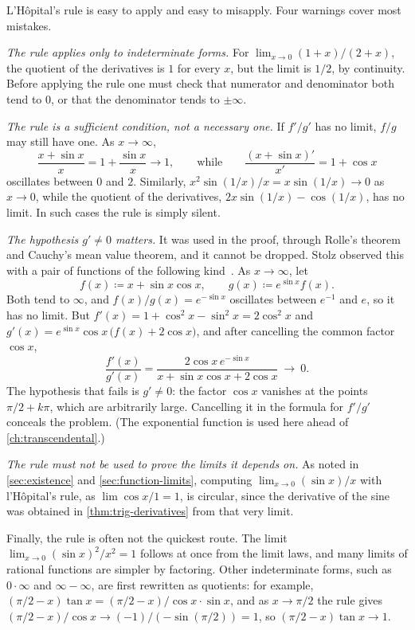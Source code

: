 L'H\^opital's rule is easy to apply and easy to misapply. Four warnings cover most mistakes.

\emph{The rule applies only to indeterminate forms.} For $\lim_{x\to0}(1+x)/(2+x)$, the quotient of the derivatives is $1$ for every $x$, but the limit is $1/2$, by continuity. Before applying the rule one must check that numerator and denominator both tend to $0$, or that the denominator tends to $\pm\infty$.

\emph{The rule is a sufficient condition, not a necessary one.} If $f'/g'$ has no limit, $f/g$ may still have one. As $x\to\infty$,
\[
\frac{x+\sin x}x=1+\frac{\sin x}x\to1,\qquad\text{while}\qquad\frac{(x+\sin x)'}{x'}=1+\cos x
\]
oscillates between $0$ and $2$. Similarly, $x^2\sin(1/x)/x=x\sin(1/x)\to0$ as $x\to0$, while the quotient of the derivatives, $2x\sin(1/x)-\cos(1/x)$, has no limit. In such cases the rule is simply silent.

\emph{The hypothesis $g'\ne0$ matters.} It was used in the proof, through Rolle's theorem and Cauchy's mean value theorem, and it cannot be dropped. Stolz observed this with a pair of functions of the following kind~\cite{boas1986}. As $x\to\infty$, let
\[
f(x)\coloneqq x+\sin x\cos x,\qquad g(x)\coloneqq e^{\sin x}f(x).
\]
Both tend to $\infty$, and $f(x)/g(x)=e^{-\sin x}$ oscillates between $e^{-1}$ and $e$, so it has no limit. But $f'(x)=1+\cos^2x-\sin^2x=2\cos^2x$ and $g'(x)=e^{\sin x}\cos x\,\bigl(f(x)+2\cos x\bigr)$, and after cancelling the common factor $\cos x$,
\[
\frac{f'(x)}{g'(x)}=\frac{2\cos x\,e^{-\sin x}}{x+\sin x\cos x+2\cos x}\ \longrightarrow\ 0 .
\]
The hypothesis that fails is $g'\ne0$: the factor $\cos x$ vanishes at the points $\pi/2+k\pi$, which are arbitrarily large. Cancelling it in the formula for $f'/g'$ conceals the problem. (The exponential function is used here ahead of \cref{ch:transcendental}.)

\emph{The rule must not be used to prove the limits it depends on.} As noted in \cref{sec:existence} and \cref{sec:function-limits}, computing $\lim_{x\to0}(\sin x)/x$ with l'H\^opital's rule, as $\lim\cos x/1=1$, is circular, since the derivative of the sine was obtained in \cref{thm:trig-derivatives} from that very limit.

Finally, the rule is often not the quickest route. The limit $\lim_{x\to0}(\sin x)^2/x^2=1$ follows at once from the limit laws, and many limits of rational functions are simpler by factoring. Other indeterminate forms, such as $0\cdot\infty$ and $\infty-\infty$, are first rewritten as quotients: for example, $(\pi/2-x)\tan x=(\pi/2-x)/\cos x\cdot\sin x$, and as $x\to\pi/2$ the rule gives $(\pi/2-x)/\cos x\to(-1)/(-\sin(\pi/2))=1$, so $(\pi/2-x)\tan x\to1$.

